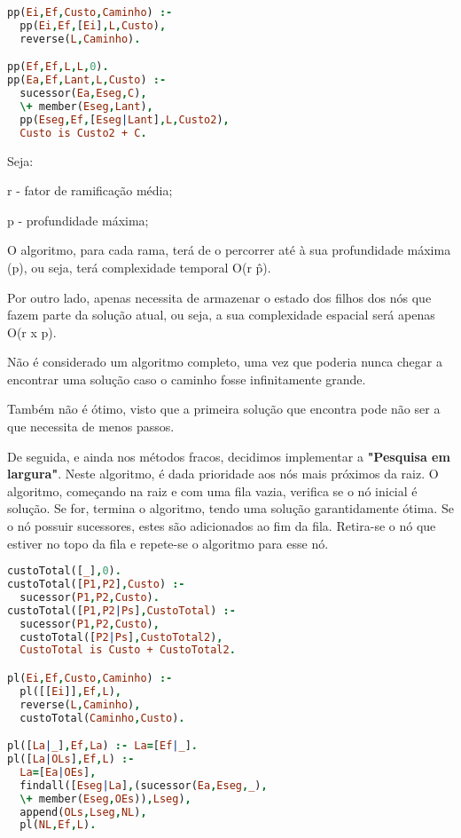 \documentclass[a4paper]{article}
\begin{document}
\begin{lstlisting}[language=Prolog,xleftmargin=.15\textwidth]
pp(Ei,Ef,Custo,Caminho) :-
  pp(Ei,Ef,[Ei],L,Custo),
  reverse(L,Caminho).

pp(Ef,Ef,L,L,0).
pp(Ea,Ef,Lant,L,Custo) :-
  sucessor(Ea,Eseg,C),
  \+ member(Eseg,Lant),
  pp(Eseg,Ef,[Eseg|Lant],L,Custo2),
  Custo is Custo2 + C.
\end{lstlisting}

Seja:

r - fator de ramificação média;

p - profundidade máxima;

O algoritmo, para cada rama, terá de o percorrer até à sua profundidade máxima (p), ou seja, terá complexidade temporal O(r \^ p).

Por outro lado, apenas necessita de armazenar o estado dos filhos dos nós que fazem parte da solução atual, ou seja, a sua complexidade espacial será apenas O(r x p).

Não é considerado um algoritmo completo, uma vez que poderia nunca chegar a encontrar uma solução caso o caminho fosse infinitamente grande.

Também não é ótimo, visto que a primeira solução que encontra pode não ser a que necessita de menos passos.

De seguida, e ainda nos métodos fracos, decidimos implementar a \textbf{"Pesquisa em largura"}. Neste algoritmo, é dada prioridade aos nós mais próximos da raiz. O algoritmo, começando na raiz e com uma fila vazia, verifica se o nó inicial é solução. Se for, termina o algoritmo, tendo uma solução garantidamente ótima. Se o nó possuir sucessores, estes são adicionados ao fim da fila. Retira-se o nó que estiver no topo da fila e repete-se o algoritmo para esse nó.

\begin{lstlisting}[language=Prolog,xleftmargin=.1\textwidth]
custoTotal([_],0).
custoTotal([P1,P2],Custo) :-
  sucessor(P1,P2,Custo).
custoTotal([P1,P2|Ps],CustoTotal) :-
  sucessor(P1,P2,Custo),
  custoTotal([P2|Ps],CustoTotal2),
  CustoTotal is Custo + CustoTotal2.

pl(Ei,Ef,Custo,Caminho) :-
  pl([[Ei]],Ef,L),
  reverse(L,Caminho),
  custoTotal(Caminho,Custo).

pl([La|_],Ef,La) :- La=[Ef|_].
pl([La|OLs],Ef,L) :-
  La=[Ea|OEs],
  findall([Eseg|La],(sucessor(Ea,Eseg,_),
  \+ member(Eseg,OEs)),Lseg),
  append(OLs,Lseg,NL),
  pl(NL,Ef,L).
\end{lstlisting}
\end{document}
